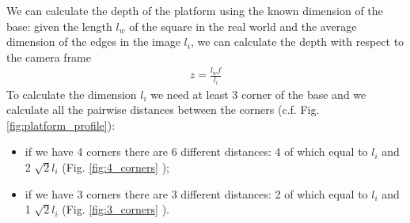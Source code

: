 We can calculate the depth of the platform using the known dimension of the base: given the length $l_w$ of the square in the real world and the average dimension of the edges in the image $l_i$, we can calculate the depth with respect to the camera frame 
\begin{align}
z = \frac{l_w f}{l_i}
\end{align}
To calculate the dimension $l_i$ we need at least 3 corner of the base and we calculate all the pairwise distances between the corners (c.f. Fig. \ref{fig:platform_profile}):
\begin{itemize}
\item if we have 4 corners there are 6 different distances: 4 of which equal to $l_i$ and 2 $\sqrt{2}l_i$ (Fig. \ref{fig:4_corners} );
\item if we have 3 corners there are 3 different distances: 2 of which equal to $l_i$ and 1 $\sqrt{2}l_i$  (Fig. \ref{fig:3_corners} ).
\end{itemize}

